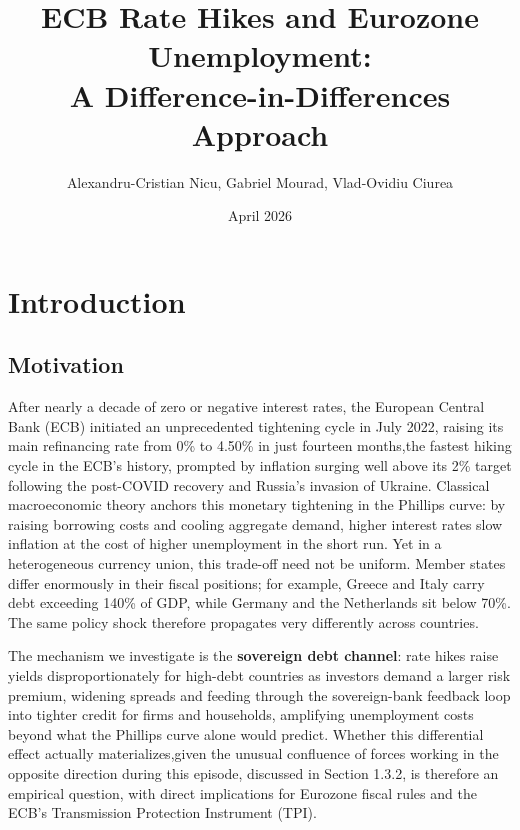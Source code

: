 \documentclass[11pt,a4paper]{article}
\title{\textbf{ECB Rate Hikes and Eurozone Unemployment:\\
A Difference-in-Differences Approach}}
\author{Alexandru-Cristian Nicu, Gabriel Mourad, Vlad-Ovidiu Ciurea}
\date{April 2026}
\begin{document}
\maketitle

\newpage

\tableofcontents
\newpage

\section{Introduction}

\subsection{Motivation}

After nearly a decade of zero or negative interest rates, the European Central Bank (ECB) initiated an unprecedented tightening cycle in July 2022, raising its main refinancing rate from 0\% to 4.50\% in just fourteen months,the fastest hiking cycle in the ECB's history, prompted by inflation surging well above its 2\% target following the post-COVID recovery and Russia's invasion of Ukraine. Classical macroeconomic theory anchors this monetary tightening in the Phillips curve: by raising borrowing costs and cooling aggregate demand, higher interest rates slow inflation at the cost of higher unemployment in the short run. Yet in a heterogeneous currency union, this trade-off need not be uniform. Member states differ enormously in their fiscal positions; for example, Greece and Italy carry debt exceeding 140\% of GDP, while Germany and the Netherlands sit below 70\%. The same policy shock therefore propagates very differently across countries.

The mechanism we investigate is the \textbf{sovereign debt channel}: rate hikes raise yields disproportionately for high-debt countries as investors demand a larger risk premium, widening spreads and feeding through the sovereign-bank feedback loop into tighter credit for firms and households, amplifying unemployment costs beyond what the Phillips curve alone would predict. Whether this differential effect actually materializes,given the unusual confluence of forces working in the opposite direction during this episode, discussed in Section 1.3.2, is therefore an empirical question, with direct implications for Eurozone fiscal rules and the ECB's Transmission Protection Instrument (TPI).
\end{document}

